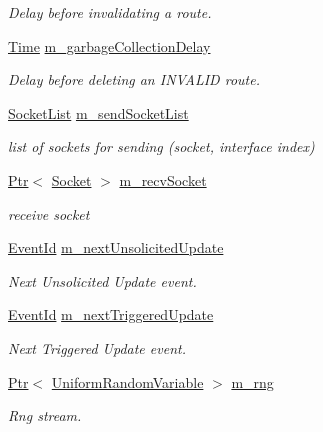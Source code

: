 \begin{DoxyCompactItemize}
\begin{DoxyCompactList}\small\item\em Delay before invalidating a route. \end{DoxyCompactList}\item 
\hyperlink{classns3_1_1Time}{Time} \hyperlink{classns3_1_1Rip_ad317e92ae9d78b20642be47df4e8d866}{m\+\_\+garbage\+Collection\+Delay}
\begin{DoxyCompactList}\small\item\em Delay before deleting an I\+N\+V\+A\+L\+ID route. \end{DoxyCompactList}\item 
\hyperlink{classns3_1_1Rip_afc81050735dfff6d48facd8284f0954f}{Socket\+List} \hyperlink{classns3_1_1Rip_a58b5f6ebcee2ed04249fd025abfa61cb}{m\+\_\+send\+Socket\+List}
\begin{DoxyCompactList}\small\item\em list of sockets for sending (socket, interface index) \end{DoxyCompactList}\item 
\hyperlink{classns3_1_1Ptr}{Ptr}$<$ \hyperlink{classns3_1_1Socket}{Socket} $>$ \hyperlink{classns3_1_1Rip_a6c5dc1b74475e3caa0782f37b722be6b}{m\+\_\+recv\+Socket}
\begin{DoxyCompactList}\small\item\em receive socket \end{DoxyCompactList}\item 
\hyperlink{classns3_1_1EventId}{Event\+Id} \hyperlink{classns3_1_1Rip_a52794ab079ab76322bedc46a8ea99d0a}{m\+\_\+next\+Unsolicited\+Update}
\begin{DoxyCompactList}\small\item\em Next Unsolicited Update event. \end{DoxyCompactList}\item 
\hyperlink{classns3_1_1EventId}{Event\+Id} \hyperlink{classns3_1_1Rip_a66c28747adb18044611ceab7fbba57a8}{m\+\_\+next\+Triggered\+Update}
\begin{DoxyCompactList}\small\item\em Next Triggered Update event. \end{DoxyCompactList}\item 
\hyperlink{classns3_1_1Ptr}{Ptr}$<$ \hyperlink{classns3_1_1UniformRandomVariable}{Uniform\+Random\+Variable} $>$ \hyperlink{classns3_1_1Rip_aff68d9a9e912bc0a99201bee4d93e636}{m\+\_\+rng}
\begin{DoxyCompactList}\small\item\em Rng stream. \end{DoxyCompactList}\item 

\end{DoxyCompactItemize}
